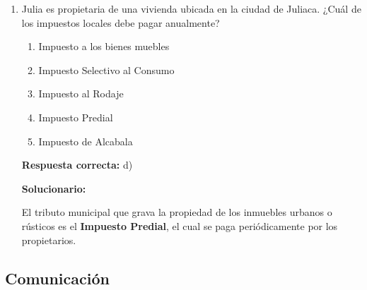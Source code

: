 \begin{enumerate}[resume]
	\vspace{2mm}
	\textbf{Solucionario:}
	
	El pago que se realiza por recibir un servicio administrativo individualizado del Estado, como el duplicado del DNI, es una \textbf{tasa}. No es multa ni contribución.
	
	\vspace{6mm}
	
	\item Julia es propietaria de una vivienda ubicada en la ciudad de Juliaca. ¿Cuál de los impuestos locales debe pagar anualmente?
	\begin{enumerate}[label=\alph*)]
		\item Impuesto a los bienes muebles
		\item Impuesto Selectivo al Consumo
		\item Impuesto al Rodaje
		\item Impuesto Predial
		\item Impuesto de Alcabala
	\end{enumerate}
	\textbf{Respuesta correcta:} d)
	
	\vspace{2mm}
	\textbf{Solucionario:}
	
	El tributo municipal que grava la propiedad de los inmuebles urbanos o rústicos es el \textbf{Impuesto Predial}, el cual se paga periódicamente por los propietarios.
	
	\vspace{6mm}
	
\end{enumerate}

\subsection*{Comunicación}

